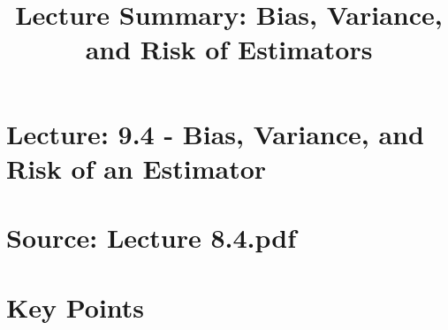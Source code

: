 \documentclass{article}
\title{Lecture Summary: Bias, Variance, and Risk of Estimators}
\author{}
\date{}
\begin{document}
\maketitle

\section*{Lecture: 9.4 - Bias, Variance, and Risk of an Estimator}
\section*{Source: Lecture 8.4.pdf}

\section*{Key Points}
\end{document}
